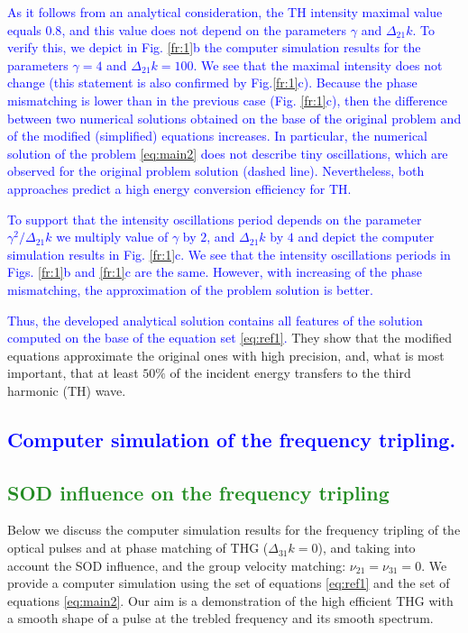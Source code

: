 \documentclass[a4paper, 12pt, onecolumn]{extarticle}
\begin{document}
\textcolor{blue}{
As it follows from an analytical consideration, the TH intensity maximal value equals \(0.8\), and this value does not depend on the parameters \(\gamma\) and \(\Delta_{21}k\). To verify this, we depict in Fig. \ref{fr:1}b the computer simulation results for the parameters \(\gamma=4\) and \(\Delta_{21}k=100\). We see that the maximal intensity does not change (this statement is also confirmed by Fig.\ref{fr:1}c). Because the phase mismatching is lower than in the previous case (Fig. \ref{fr:1}c), then the difference between two numerical solutions obtained on the base of the original problem and of the modified (simplified) equations increases. In particular, the numerical solution of the problem \eqref{eq:main2} does not describe tiny oscillations, which are observed for the original problem solution (dashed line). Nevertheless, both approaches predict a high energy conversion efficiency for TH.
}

\textcolor{blue}{
To support that the intensity oscillations period depends on the parameter \(\gamma^2/\Delta_{21}k\) we multiply value of \(\gamma\) by \(2\), and \(\Delta_{21}k\) by \(4\) and depict the computer simulation results in Fig. \ref{fr:1}c. We see that the intensity oscillations periods in Figs. \ref{fr:1}b and \ref{fr:1}c are the same. However, with increasing of the phase mismatching, the approximation of the problem solution is better.
}

\textcolor{blue}
{
Thus, the developed analytical solution contains all features of the solution computed on the base of the equation set \eqref{eq:ref1}.
}
They show that the modified equations approximate the original ones with high precision, and, what is most important, that at least $50\%$ of the incident energy transfers to the third harmonic (TH) wave.

\textcolor{blue}{
\section{Computer simulation of the frequency tripling.}
}
\textcolor{ForestGreen}
{
\subsection{SOD influence on the frequency tripling}
}
Below we discuss the computer simulation results for the frequency tripling of the optical pulses and at phase matching of THG (\(\Delta_{31}k=0\)), and taking into account the SOD influence, and the group velocity matching: \(\nu_{21}=\nu_{31}=0\). We provide a computer simulation using the set of equations \eqref{eq:ref1} and the set of equations \eqref{eq:main2}. Our aim is a demonstration of the high efficient THG with a smooth shape of a pulse at the trebled frequency and its smooth spectrum. 
\end{document}
